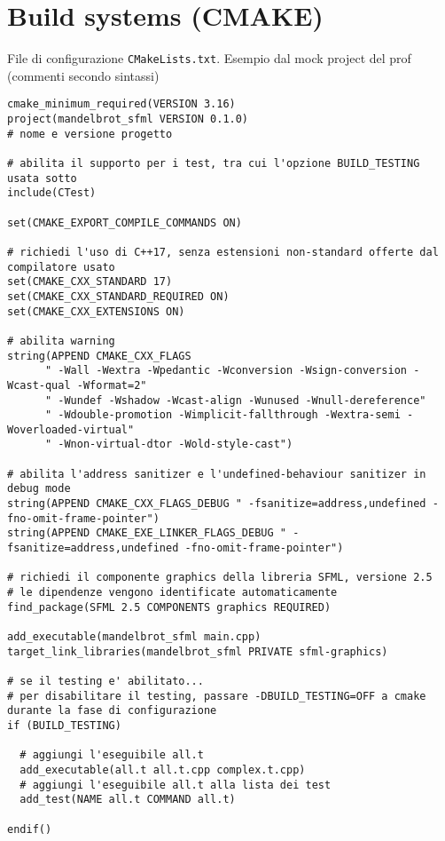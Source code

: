 \documentclass[10pt, oneside]{Book}
\begin{document}
\section{Build systems (CMAKE)}
File di configurazione \texttt{CMakeLists.txt}. Esempio dal mock project del prof (commenti secondo sintassi)
\begin{verbatim}
cmake_minimum_required(VERSION 3.16)
project(mandelbrot_sfml VERSION 0.1.0)
# nome e versione progetto

# abilita il supporto per i test, tra cui l'opzione BUILD_TESTING usata sotto
include(CTest)

set(CMAKE_EXPORT_COMPILE_COMMANDS ON)

# richiedi l'uso di C++17, senza estensioni non-standard offerte dal compilatore usato 
set(CMAKE_CXX_STANDARD 17)
set(CMAKE_CXX_STANDARD_REQUIRED ON)
set(CMAKE_CXX_EXTENSIONS ON)

# abilita warning
string(APPEND CMAKE_CXX_FLAGS
      " -Wall -Wextra -Wpedantic -Wconversion -Wsign-conversion -Wcast-qual -Wformat=2"
      " -Wundef -Wshadow -Wcast-align -Wunused -Wnull-dereference"
      " -Wdouble-promotion -Wimplicit-fallthrough -Wextra-semi -Woverloaded-virtual"
      " -Wnon-virtual-dtor -Wold-style-cast")

# abilita l'address sanitizer e l'undefined-behaviour sanitizer in debug mode
string(APPEND CMAKE_CXX_FLAGS_DEBUG " -fsanitize=address,undefined -fno-omit-frame-pointer")
string(APPEND CMAKE_EXE_LINKER_FLAGS_DEBUG " -fsanitize=address,undefined -fno-omit-frame-pointer")

# richiedi il componente graphics della libreria SFML, versione 2.5
# le dipendenze vengono identificate automaticamente
find_package(SFML 2.5 COMPONENTS graphics REQUIRED)

add_executable(mandelbrot_sfml main.cpp)
target_link_libraries(mandelbrot_sfml PRIVATE sfml-graphics)

# se il testing e' abilitato...
# per disabilitare il testing, passare -DBUILD_TESTING=OFF a cmake durante la fase di configurazione
if (BUILD_TESTING)

  # aggiungi l'eseguibile all.t
  add_executable(all.t all.t.cpp complex.t.cpp)
  # aggiungi l'eseguibile all.t alla lista dei test
  add_test(NAME all.t COMMAND all.t)

endif()
\end{verbatim}
\end{document}
